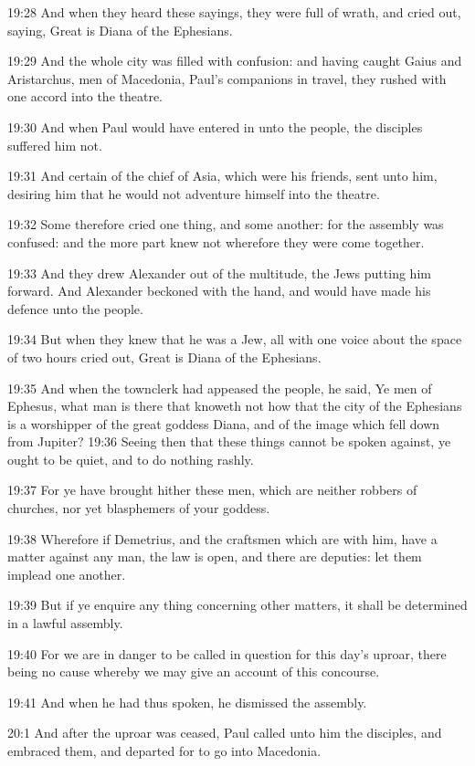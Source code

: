 19:28 And when they heard these sayings, they were full of wrath, and cried out, saying, Great is Diana of the Ephesians.

19:29 And the whole city was filled with confusion: and having caught Gaius and Aristarchus, men of Macedonia, Paul's companions in travel, they rushed with one accord into the theatre.

19:30 And when Paul would have entered in unto the people, the disciples suffered him not.

19:31 And certain of the chief of Asia, which were his friends, sent unto him, desiring him that he would not adventure himself into the theatre.

19:32 Some therefore cried one thing, and some another: for the assembly was confused: and the more part knew not wherefore they were come together.

19:33 And they drew Alexander out of the multitude, the Jews putting him forward. And Alexander beckoned with the hand, and would have made his defence unto the people.

19:34 But when they knew that he was a Jew, all with one voice about the space of two hours cried out, Great is Diana of the Ephesians.

19:35 And when the townclerk had appeased the people, he said, Ye men of Ephesus, what man is there that knoweth not how that the city of the Ephesians is a worshipper of the great goddess Diana, and of the image which fell down from Jupiter?  19:36 Seeing then that these things cannot be spoken against, ye ought to be quiet, and to do nothing rashly.

19:37 For ye have brought hither these men, which are neither robbers of churches, nor yet blasphemers of your goddess.

19:38 Wherefore if Demetrius, and the craftsmen which are with him, have a matter against any man, the law is open, and there are deputies: let them implead one another.

19:39 But if ye enquire any thing concerning other matters, it shall be determined in a lawful assembly.

19:40 For we are in danger to be called in question for this day's uproar, there being no cause whereby we may give an account of this concourse.

19:41 And when he had thus spoken, he dismissed the assembly.

20:1 And after the uproar was ceased, Paul called unto him the disciples, and embraced them, and departed for to go into Macedonia.


